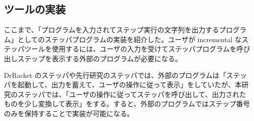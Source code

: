 \subsection{ツールの実装}

ここまで、「プログラムを入力されてステップ実行の文字列を出力するプログラム」としてのステッパプログラムの実装を紹介した。ユーザが incremental なステッパツールを使用するには、ユーザの入力を受けてステッパプログラムを呼び出しステップを表示する外部のプログラムが必要になる。

DrRacket のステッパ\cite{clements01}や先行研究のステッパ\cite{FSA18}では、外部のプログラムは「ステッパを起動して、出力を蓄えて、ユーザの操作に従って表示」をしていたが、本研究のステッパでは、「ユーザの操作に従ってステッパを呼び出して、出力されたものを少し変換して表示」をする。すると、外部のプログラムではステップ番号のみを保持することで実装が可能になる。
